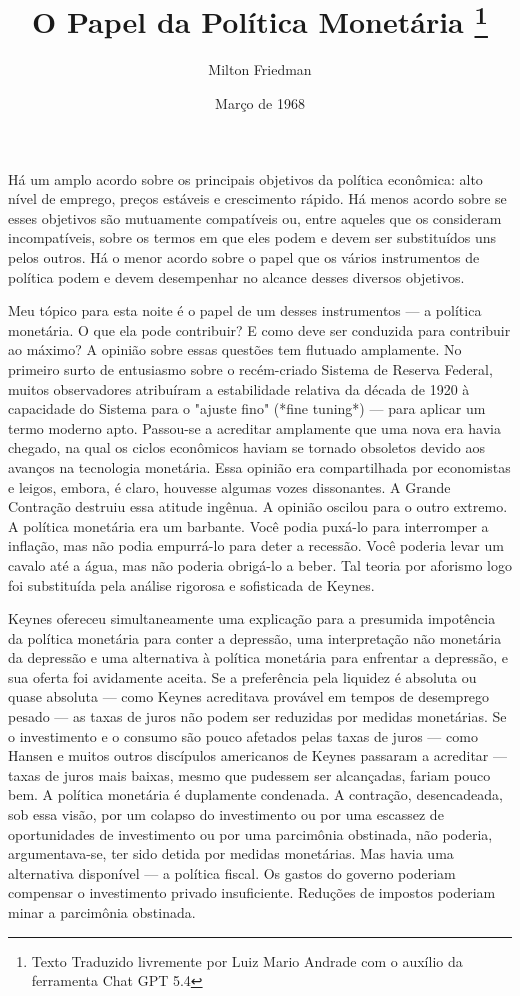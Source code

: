 \documentclass[12pt]{article}
\title{O Papel da Política Monetária \thanks{Texto Traduzido livremente por Luiz Mario Andrade com o auxílio da ferramenta Chat GPT 5.4}}
\author{Milton Friedman}
\date{Março de 1968}
\begin{document}
\maketitle

Há um amplo acordo sobre os principais objetivos da política econômica: alto nível de emprego, preços estáveis e crescimento rápido. Há menos acordo sobre se esses objetivos são mutuamente compatíveis ou, entre aqueles que os consideram incompatíveis, sobre os termos em que eles podem e devem ser substituídos uns pelos outros. Há o menor acordo sobre o papel que os vários instrumentos de política podem e devem desempenhar no alcance desses diversos objetivos.

Meu tópico para esta noite é o papel de um desses instrumentos — a política monetária. O que ela pode contribuir? E como deve ser conduzida para contribuir ao máximo? A opinião sobre essas questões tem flutuado amplamente. No primeiro surto de entusiasmo sobre o recém-criado Sistema de Reserva Federal, muitos observadores atribuíram a estabilidade relativa da década de 1920 à capacidade do Sistema para o "ajuste fino" (*fine tuning*) — para aplicar um termo moderno apto. Passou-se a acreditar amplamente que uma nova era havia chegado, na qual os ciclos econômicos haviam se tornado obsoletos devido aos avanços na tecnologia monetária. Essa opinião era compartilhada por economistas e leigos, embora, é claro, houvesse algumas vozes dissonantes. A Grande Contração destruiu essa atitude ingênua. A opinião oscilou para o outro extremo. A política monetária era um barbante. Você podia puxá-lo para interromper a inflação, mas não podia empurrá-lo para deter a recessão. Você poderia levar um cavalo até a água, mas não poderia obrigá-lo a beber. Tal teoria por aforismo logo foi substituída pela análise rigorosa e sofisticada de Keynes.

Keynes ofereceu simultaneamente uma explicação para a presumida impotência da política monetária para conter a depressão, uma interpretação não monetária da depressão e uma alternativa à política monetária para enfrentar a depressão, e sua oferta foi avidamente aceita. Se a preferência pela liquidez é absoluta ou quase absoluta — como Keynes acreditava provável em tempos de desemprego pesado — as taxas de juros não podem ser reduzidas por medidas monetárias. Se o investimento e o consumo são pouco afetados pelas taxas de juros — como Hansen e muitos outros discípulos americanos de Keynes passaram a acreditar — taxas de juros mais baixas, mesmo que pudessem ser alcançadas, fariam pouco bem. A política monetária é duplamente condenada. A contração, desencadeada, sob essa visão, por um colapso do investimento ou por uma escassez de oportunidades de investimento ou por uma parcimônia obstinada, não poderia, argumentava-se, ter sido detida por medidas monetárias. Mas havia uma alternativa disponível — a política fiscal. Os gastos do governo poderiam compensar o investimento privado insuficiente. Reduções de impostos poderiam minar a parcimônia obstinada.
\end{document}

